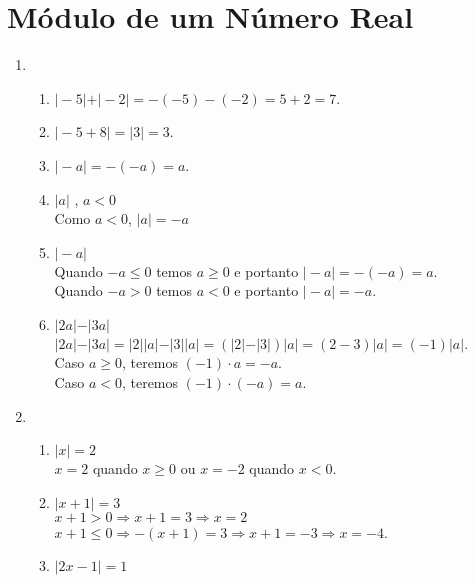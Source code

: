 \section{Módulo de um Número Real}
\begin{enumerate}
	\setcounter{enumi}{0}
	\item %
	\begin{enumerate}
		\item %
		$\vert-5\vert + \vert-2\vert = -(-5) - (-2) = 5 + 2 = 7$.
		\item %
		$\vert-5 + 8\vert = \vert 3 \vert = 3$.
		\item %
		$\vert-a\vert = -(-a) = a$.
		\item %
		$\vert a \vert$ , $a < 0$\\
		Como $a < 0$, $\vert a \vert = -a $
		\item %
		$\vert -a \vert$\\
		Quando $-a \leq 0$ temos $a \geq 0$  e portanto $\vert -a \vert = -(-a)= a$.\\
		Quando $-a > 0$ temos $a < 0$ e portanto $\vert -a \vert = -a$.
		\item %
		$\vert 2a \vert - \vert 3a \vert$\\
		$\vert 2a \vert - \vert 3a \vert = \vert 2\vert \vert a \vert - \vert 3 \vert \vert a \vert = \left( \vert 2\vert  - \vert 3 \vert \right)\vert a \vert = \left( 2  -  3 \right)\vert a \vert = \left(-1 \right)\vert a \vert$.\\
		Caso $a \geq 0$, teremos $\left(-1\right)\cdot a = -a$.\\
		Caso $a < 0$, teremos $(-1)\cdot \left(-a\right) = a$.
	\end{enumerate}
	\item %
	\begin{enumerate}
		\item %
		$\vert x \vert = 2$\\
		$x = 2$ quando $x \geq 0$ ou $x = - 2$ quando $x < 0$.
		\item %
		$\vert x + 1 \vert = 3$\\
		$x + 1 > 0 \Rightarrow x + 1 = 3 \Rightarrow x = 2$\\
		$x + 1 \leq 0 \Rightarrow -(x + 1) = 3 \Rightarrow x + 1 = -3 \Rightarrow x = -4$.
		\item %
		$\vert 2x - 1 \vert = 1$\\

\end{enumerate}
\end{enumerate}
